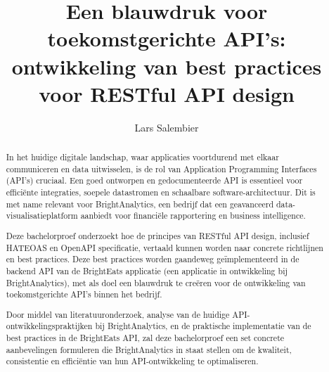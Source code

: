 \documentclass{hogent-article}
\title{Een blauwdruk voor toekomstgerichte API's: ontwikkeling van best practices voor RESTful API design}
\author{Lars Salembier}
\begin{document}
\begin{abstract}
  In het huidige digitale landschap, waar applicaties voortdurend met elkaar communiceren en data uitwisselen, is de rol van Application Programming Interfaces (API's) cruciaal. Een goed ontworpen en gedocumenteerde API is essentieel voor efficiënte integraties, soepele datastromen en schaalbare software-architectuur. Dit is met name relevant voor BrightAnalytics, een bedrijf dat een geavanceerd data-visualisatieplatform aanbiedt voor financiële rapportering en business intelligence.

  \bigskip

  Deze bachelorproef onderzoekt hoe de principes van RESTful API design, inclusief HATEOAS en OpenAPI specificatie, vertaald kunnen worden naar concrete richtlijnen en best practices. Deze best practices worden gaandeweg geïmplementeerd in de backend API van de BrightEats applicatie (een applicatie in ontwikkeling bij BrightAnalytics), met als doel een blauwdruk te creëren voor de ontwikkeling van toekomstgerichte API's binnen het bedrijf.

  \bigskip

  Door middel van literatuuronderzoek, analyse van de huidige API-ontwikkelingspraktijken bij BrightAnalytics, en de praktische implementatie van de best practices in de BrightEats API, zal deze bachelorproef een set concrete aanbevelingen formuleren die BrightAnalytics in staat stellen om de kwaliteit, consistentie en efficiëntie van hun API-ontwikkeling te optimaliseren.
\end{abstract}

\tableofcontents



\printbibliography[heading=bibintoc]
\end{document}
